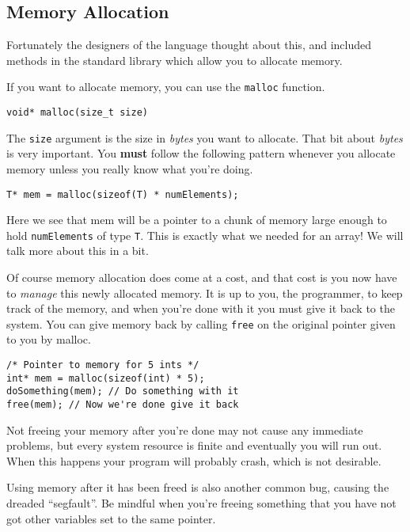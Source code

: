\subsection{Memory Allocation}

Fortunately the designers of the language thought about this, and included methods in the standard library which allow you to allocate memory.

If you want to allocate memory, you can use the \texttt{malloc} function. 

\begin{lstlisting}[numbers=none,frame=none]
void* malloc(size_t size)
\end{lstlisting}

The \texttt{size} argument is the size in \emph{bytes} you want to allocate.
That bit about \emph{bytes} is very important.
You \textbf{must} follow the following pattern whenever you allocate memory unless you really know what you're doing.

\begin{lstlisting}[numbers=none,frame=none]
T* mem = malloc(sizeof(T) * numElements);
\end{lstlisting}

Here we see that mem will be a pointer to a chunk of memory large enough to hold \texttt{numElements} of type \texttt{T}.
This is exactly what we needed for an array!
We will talk more about this in a bit.

Of course memory allocation does come at a cost, and that cost is you now have to \emph{manage} this newly allocated memory.
It is up to you, the programmer, to keep track of the memory, and when you're done with it you must give it back to the system.
You can give memory back by calling \texttt{free} on the original pointer given to you by malloc.

\begin{lstlisting}
/* Pointer to memory for 5 ints */
int* mem = malloc(sizeof(int) * 5);
doSomething(mem); // Do something with it
free(mem); // Now we're done give it back
\end{lstlisting}

Not freeing your memory after you're done may not cause any immediate problems, but every system resource is finite and eventually you will run out.
When this happens your program will probably crash, which is not desirable.

Using memory after it has been freed is also another common bug, causing the dreaded ``segfault''.
Be mindful when you're freeing something that you have not got other variables set to the same pointer.

